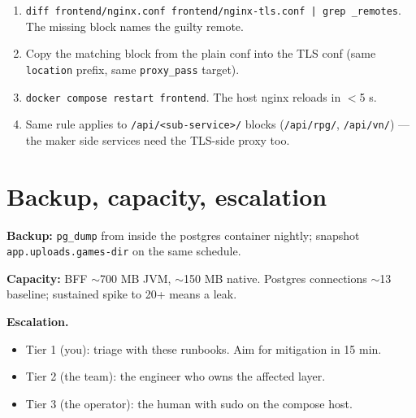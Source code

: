 \documentclass[11pt,a4paper,openany]{book}
\begin{document}
\begin{enumerate}
  \item \texttt{diff frontend/nginx.conf frontend/nginx-tls.conf | grep
        \_remotes}. The missing block names the guilty remote.
  \item Copy the matching block from the plain conf into the TLS conf
        (same \texttt{location} prefix, same \texttt{proxy\_pass}
        target).
  \item \texttt{docker compose restart frontend}. The host nginx
        reloads in $<$5 s.
  \item Same rule applies to \texttt{/api/<sub-service>/} blocks
        (\texttt{/api/rpg/}, \texttt{/api/vn/}) --- the maker side
        services need the TLS-side proxy too.
\end{enumerate}

\chapter{Backup, capacity, escalation}
\textbf{Backup:} \texttt{pg\_dump} from inside the postgres container
nightly; snapshot \texttt{app.uploads.games-dir} on the same schedule.

\textbf{Capacity:} BFF $\sim$700 MB JVM, $\sim$150 MB native. Postgres
connections $\sim$13 baseline; sustained spike to 20+ means a leak.

\textbf{Escalation.}
\begin{itemize}
  \item Tier 1 (you): triage with these runbooks. Aim for mitigation
        in 15 min.
  \item Tier 2 (the team): the engineer who owns the affected layer.
  \item Tier 3 (the operator): the human with sudo on the compose host.
\end{itemize}
\end{document}

